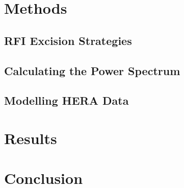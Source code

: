 \documentclass[12pt]{article}
\begin{document}
\section{Methods}
\subsection{RFI Excision Strategies}
\subsection{Calculating the Power Spectrum}
\subsection{Modelling HERA Data}

\section{Results}

\section{Conclusion}



\end{document}
